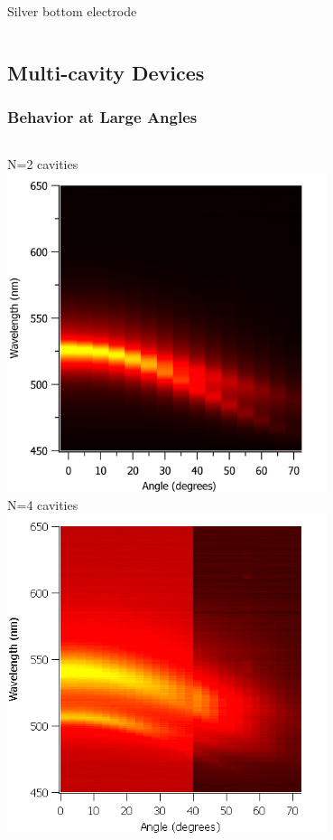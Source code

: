 \documentclass{beamer}
\begin{document}
\begin{frame}
\begin{columns}
\begin{column}{0.5\textwidth}
					Silver bottom electrode
				\end{column}
            \end{columns}
        \end{frame}
        
    \subsection{Multi-cavity Devices}
        
        \begin{frame}
            \frametitle{Behavior at Large Angles}
            \begin{columns}
				\begin{column}{0.5\textwidth}
					\centering
					N=2 cavities\\
					\includegraphics[width=0.7\textwidth]{images/n2_heatmap.png}\\
					N=4 cavities\\
					\includegraphics[width=0.7\textwidth]{images/n4_heatmap.png}

\end{column}
\end{columns}
\end{frame}
\end{document}
